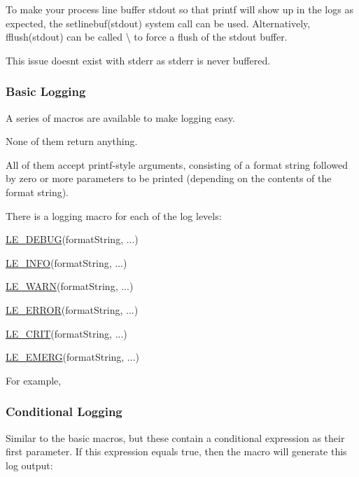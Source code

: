 To make your process line buffer stdout so that printf will show up in the logs as expected, the {\ttfamily setlinebuf(stdout)} system call can be used. Alternatively, {\ttfamily fflush(stdout)} can be called \textbackslash{} to force a flush of the stdout buffer.

This issue doesn\textquotesingle{}t exist with stderr as stderr is never buffered.\hypertarget{c_logging_c_log_basic_logging}{}\subsubsection{Basic Logging}\label{c_logging_c_log_basic_logging}
A series of macros are available to make logging easy.

None of them return anything.

All of them accept printf-\/style arguments, consisting of a format string followed by zero or more parameters to be printed (depending on the contents of the format string).

There is a logging macro for each of the log levels\+:


\begin{DoxyItemize}
\item \hyperlink{le__log_8h_a2a91ea8857cf190fde71d85ba930a498}{L\+E\+\_\+\+D\+E\+B\+U\+G}(format\+String, ...)
\item \hyperlink{le__log_8h_a23e6d206faa64f612045d688cdde5808}{L\+E\+\_\+\+I\+N\+F\+O}(format\+String, ...)
\item \hyperlink{le__log_8h_a0201b2f60ee0e945479f91e181bf04b6}{L\+E\+\_\+\+W\+A\+R\+N}(format\+String, ...)
\item \hyperlink{le__log_8h_a353590f91b3143a7ba3a416ae5a50c3d}{L\+E\+\_\+\+E\+R\+R\+O\+R}(format\+String, ...)
\item \hyperlink{le__log_8h_a5efa1e4b6292c820c8555b4066a5c10d}{L\+E\+\_\+\+C\+R\+I\+T}(format\+String, ...)
\item \hyperlink{le__log_8h_a651e75cb4ec9d59f5ddc7bae2fbdde88}{L\+E\+\_\+\+E\+M\+E\+R\+G}(format\+String, ...)
\end{DoxyItemize}

For example, 
\hypertarget{c_logging_c_log_conditional_logging}{}\subsubsection{Conditional Logging}\label{c_logging_c_log_conditional_logging}
Similar to the basic macros, but these contain a conditional expression as their first parameter. If this expression equals true, then the macro will generate this log output\+:


